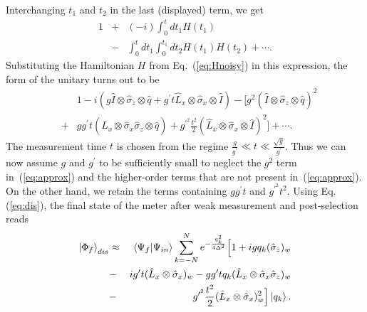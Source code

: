 \documentclass[aps,pra,showpacs,twoside,twocolumn,10pt]{revtex4-1}
\begin{document}
Interchanging $t_1$ and $t_2$ in the last (displayed) term, we get
\begin{eqnarray}
 1&+& (-i) \int_{0}^{t}dt_1 H(t_1)\nonumber\\
&-& \int_{0}^{t}dt_1 \int_{0}^{t_1}dt_2 H(t_1)H(t_2)+ \cdots.
\label{ramakantakamar}
\end{eqnarray}
Substituting the Hamiltonian $H$ from Eq.~(\ref{eq:Hnoisy}) in this expression, the form of the unitary turns out to be 
{\begin{eqnarray}
\label{eq:approx}
&&1-i({g\hat{I} \otimes \hat{\sigma}_z \otimes \hat{q}+g^\prime t \hat{L}_x\otimes \hat{\sigma}_x} \otimes \hat{I}) -[g^2(\hat{I} \otimes \hat{\sigma}_z \otimes \hat{q})^2 \nonumber\\ 
&+& g g^\prime t (\hat{L}_x \otimes \hat{\sigma}_x\hat{\sigma}_z \otimes \hat{q})+g^{\prime^2} \frac{t^2}{2}(\hat{L}_x \otimes \hat{\sigma}_x \otimes \hat{I})^2]+ \cdots. \quad \quad
\end{eqnarray}}
The measurement time $t$ is chosen from the regime {$\frac{g}{g^{\prime}} \ll t \ll \frac{\sqrt{g}}{g^{\prime}}$}. Thus we can
now assume $g$ and $g^{\prime}$ to be sufficiently small to neglect the $g^2$ term in~(\ref{eq:approx}) and the higher-order terms that are not present in~(\ref{eq:approx}).
On the other hand, we retain the terms containing $gg^{\prime}t$ and $g^{\prime^2}t^2$. Using Eq. %
(\ref{eq:dis}), the final state of the meter after weak measurement and post-selection reads  
\begin{eqnarray}
\label{eqn:zzz}
  \ket{\Phi_f}_{dis} &\approx&  \braket{\Psi_f|\Psi_{in}}\sum_{k=-N}^{N} e^{-\frac{q_k^2}{4\Delta^2}}\Big[1+i g q_k(\hat{\sigma}_z)_w\nonumber\\ 
  &-& i g^{\prime} t (\hat{L}_x\otimes \hat{\sigma}_x)_w-gg^\prime tq_k (\hat{L}_x\otimes \hat{\sigma}_x \hat{\sigma}_z)_w \nonumber\\
  &-& g^{\prime^2}\frac{t^2}{2}(\hat{L}_x\otimes \hat{\sigma}_x)_w^2\Big]\ket{q_k}.
  \end{eqnarray}
\end{document}
